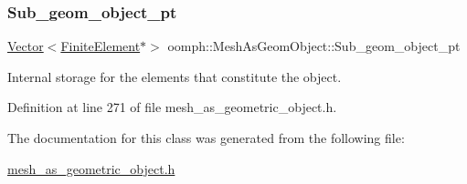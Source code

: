 \mbox{\label{classoomph_1_1MeshAsGeomObject_a47ec1120aff1d0981ad2217c78056d19}} 
\subsubsection{\texorpdfstring{Sub\+\_\+geom\+\_\+object\+\_\+pt}{Sub\_geom\_object\_pt}}
{\footnotesize\ttfamily \hyperlink{classoomph_1_1Vector}{Vector}$<$\hyperlink{classoomph_1_1FiniteElement}{Finite\+Element}$\ast$$>$ oomph\+::\+Mesh\+As\+Geom\+Object\+::\+Sub\+\_\+geom\+\_\+object\+\_\+pt\hspace{0.3cm}{\ttfamily [private]}}



Internal storage for the elements that constitute the object. 



Definition at line 271 of file mesh\+\_\+as\+\_\+geometric\+\_\+object.\+h.



The documentation for this class was generated from the following file\+:\begin{DoxyCompactItemize}
\item 
\hyperlink{mesh__as__geometric__object_8h}{mesh\+\_\+as\+\_\+geometric\+\_\+object.\+h}\end{DoxyCompactItemize}
